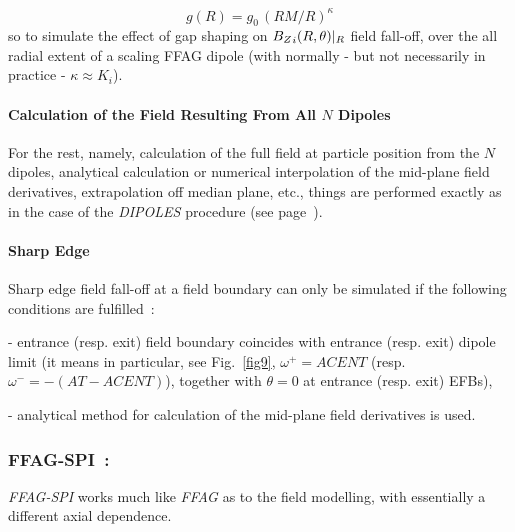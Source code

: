 \begin{equation}
\label{EqggvsR}
g(R) = g_0 \, (RM/R)^{\kappa}
\end{equation}
%
\noindent  so to simulate the effect of gap shaping on $ {B_Z}_i(R,\theta)|_R$ field fall-off,  over the 
all radial extent of a scaling FFAG dipole (with normally - but not 
necessarily in practice - $\kappa \approx K_i$). 
 

\medskip

\paragraph{Calculation of the Field Resulting From All $N$ Dipoles}

For the rest, namely, calculation of the full field at particle position from the $N$ dipoles, 
analytical   calculation or numerical interpolation of the  mid-plane field derivatives, 
extrapolation off median plane, etc., things are performed exactly as in the case of the 
 \textsl{DIPOLES} procedure (see page~\pageref{FFatAP}). 




\medskip

\paragraph{Sharp Edge} 

\noindent Sharp edge field fall-off at a field boundary  can only be simulated if the following conditions are fulfilled~: 

- entrance (resp. exit)  field boundary  coincides with entrance (resp. exit) 
dipole limit (it means in particular, see Fig.~\ref{fig9},  
$\omega^+= ACENT$ (resp. $\omega^- = -(AT-ACENT)$), 
together with $\theta=0$ at entrance (resp. exit) EFBs), 

- analytical method for calculation of the  mid-plane field derivatives is used. 







\newpage


\subsubsection*{FFAG-SPI~: \FFAGSPITitl~\cite{reportICFAFFAG,reportNIMFFAGSPI}} \label{FFAG-SPI}   
\medskip

\noindent \textsl{FFAG-SPI} works much like \textsl{FFAG} as to the field modelling, 
with essentially a different axial  dependence. 

